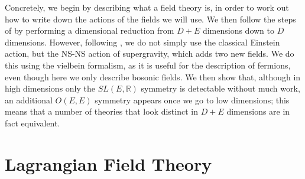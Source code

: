 \documentclass{article}
\begin{document}
Concretely, we begin by describing what a field theory is, in order to work out how to write down the actions of the fields we will use. We then follow the steps of \cite{scherk1979get} by performing a dimensional reduction from $D+E$ dimensions down to $D$ dimensions. However, following \cite{maharana1993noncompact}, we do not simply use the classical Einstein action,
but the NS-NS action of supergravity, which adds two new fields. We do this using the vielbein formalism, as it is useful for the description of fermions, even though here we only describe bosonic fields.
We then show that, although in high dimensions only the $SL(E,\mathbb{R})$ symmetry is detectable without much work, an additional $O(E,E)$ symmetry appears once we go to low dimensions; this means that
a number of theories that look distinct in $D+E$ dimensions are in fact equivalent.\\
\section{Lagrangian Field Theory}
\end{document}
